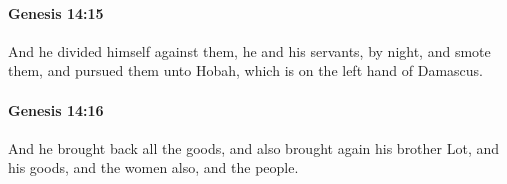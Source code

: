 		\paragraph{Genesis 14:15} %
			\label{GENESIS-14-15}

			And he divided himself against them, he and his servants, by night, and smote them, and pursued them unto Hobah, which is on the left hand of Damascus.


		\paragraph{Genesis 14:16} %
			\label{GENESIS-14-16}

			And he brought back all the goods, and also brought again his brother Lot, and his goods, and the women also, and the people.


